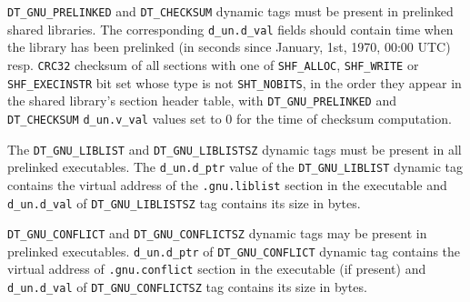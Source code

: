 \documentclass[twoside]{article}
\def\tts#1{\texttt{\small #1}}
\begin{document}
\tts{DT\_GNU\_PRELINKED} and \tts{DT\_CHECKSUM} dynamic tags must
be present in prelinked shared libraries.  The corresponding
\tts{d\_un.d\_val} fields should contain time when the library
has been prelinked (in seconds since January, 1st, 1970, 00:00 UTC)
resp. \tts{CRC32} checksum of all sections with one of
\tts{SHF\_ALLOC}, \tts{SHF\_WRITE} or \tts{SHF\_EXECINSTR} bit set
whose type is not \tts{SHT\_NOBITS}, in the order they appear in the
shared library's section header table, with \tts{DT\_GNU\_PRELINKED}
and \tts{DT\_CHECKSUM} \tts{d\_un.v\_val} values set to 0 for
the time of checksum computation.

The \tts{DT\_GNU\_LIBLIST} and \tts{DT\_GNU\_LIBLISTSZ} dynamic tags
must be present in all prelinked executables.  The \tts{d\_un.d\_ptr} value of
the \tts{DT\_GNU\_LIBLIST} dynamic tag contains the virtual address
of the \tts{.gnu.liblist} section in the executable and \tts{d\_un.d\_val}
of \tts{DT\_GNU\_LIBLISTSZ} tag contains its size in bytes.

\tts{DT\_GNU\_CONFLICT} and \tts{DT\_GNU\_CONFLICTSZ} dynamic tags
may be present in prelinked executables.  \tts{d\_un.d\_ptr} of
\tts{DT\_GNU\_CONFLICT} dynamic tag contains the virtual address
of \tts{.gnu.conflict} section in the executable (if present)
and \tts{d\_un.d\_val} of \tts{DT\_GNU\_CONFLICTSZ} tag contains
its size in bytes.
\end{document}
